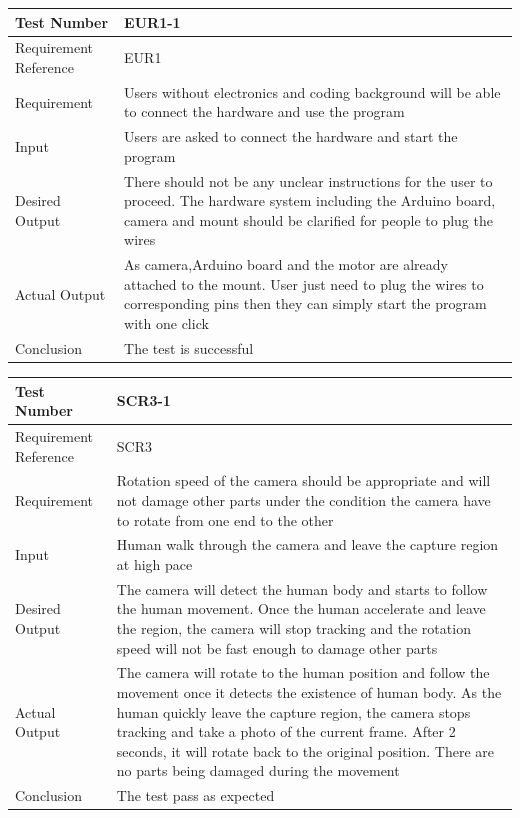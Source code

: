 \documentclass[12pt, titlepage]{article}
\begin{document}
\begin{table}[H]
\begin{center}
\begin{tabular}{|l | m{9cm}|}
\hline
  Test Number & EUR1-1\\
  \hline
  Requirement Reference & EUR1\\
  \hline
  Requirement &  Users without electronics and coding background will be able to connect the hardware and use the program\\
  \hline
  Input & Users are asked to connect the hardware and start the program\\
  \hline
  Desired Output & There should not be any unclear instructions for the user to proceed. The hardware system including the Arduino board, camera and mount should be clarified for people to plug the wires\\
  \hline
  Actual Output & As camera,Arduino board and the motor are already attached to the mount. User just need to plug the wires to corresponding pins then they can simply start the program with one click \\
  \hline
  Conclusion & The test is successful\\
  \hline
\end{tabular}
\end{center}           
\end{table}

\begin{table}[H]
\begin{center}
\begin{tabular}{|l | m{9cm}|}
\hline
  Test Number & SCR3-1\\
  \hline
  Requirement Reference & SCR3\\
  \hline
  Requirement &  Rotation speed of the camera should be appropriate and will not damage other parts under the condition the camera have to rotate from one end to the other\\
  \hline
  Input & Human walk through the camera and leave the capture region at high pace\\
  \hline
  Desired Output & The camera will detect the human body and starts to follow the human movement. Once the human accelerate and leave the region, the camera will stop tracking and the rotation speed will not be fast enough to damage other parts\\
  \hline
  Actual Output & The camera will rotate to the human position and follow the movement once it detects the existence of human body. As the human quickly leave the capture region, the camera stops tracking and take a photo of the current frame. After 2 seconds, it will rotate back to the original position. There are no parts being damaged during the movement \\
  \hline
  Conclusion & The test pass as expected\\
  \hline
\end{tabular}
\end{center}           
\end{table}
\end{document}
